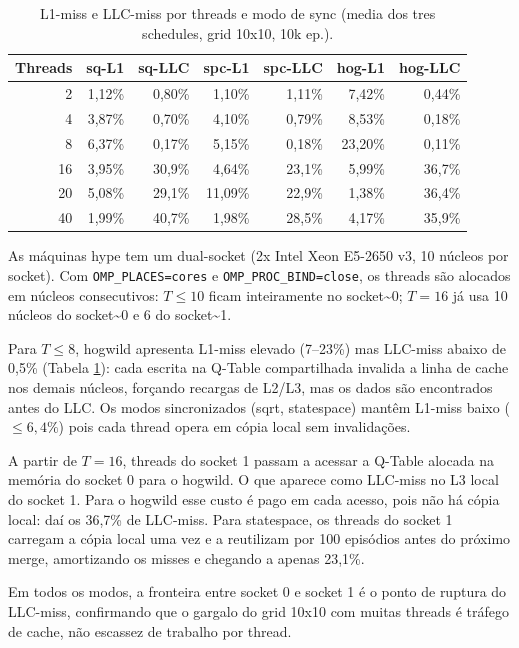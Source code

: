 \documentclass[12pt]{article}
\begin{document}
\begin{table}[htbp]
\caption{\label{tab:org0317c3a}L1-miss e LLC-miss por threads e modo de sync (media dos tres schedules, grid 10x10, 10k ep.).}
\centering
\small
\begin{tabular}{rrrrrrr}
\toprule
Threads & sq-L1 & sq-LLC & spc-L1 & spc-LLC & hog-L1 & hog-LLC\\
\midrule
2 & 1,12\% & 0,80\% & 1,10\% & 1,11\% & 7,42\% & 0,44\%\\
4 & 3,87\% & 0,70\% & 4,10\% & 0,79\% & 8,53\% & 0,18\%\\
8 & 6,37\% & 0,17\% & 5,15\% & 0,18\% & 23,20\% & 0,11\%\\
\midrule
16 & 3,95\% & 30,9\% & 4,64\% & 23,1\% & 5,99\% & 36,7\%\\
20 & 5,08\% & 29,1\% & 11,09\% & 22,9\% & 1,38\% & 36,4\%\\
40 & 1,99\% & 40,7\% & 1,98\% & 28,5\% & 4,17\% & 35,9\%\\
\bottomrule
\end{tabular}
\end{table}

As máquinas hype tem um dual-socket (2x Intel Xeon E5-2650 v3, 10
núcleos por socket). Com \texttt{OMP\_PLACES=cores} e \texttt{OMP\_PROC\_BIND=close}, os
threads são alocados em núcleos consecutivos: \(T \leq 10\) ficam
inteiramente no socket\textasciitilde{}0; \(T = 16\) já usa 10 núcleos do socket\textasciitilde{}0 e 6
do socket\textasciitilde{}1.

Para \(T \leq 8\), hogwild apresenta L1-miss elevado (7--23\%) mas LLC-miss
abaixo de 0,5\% (Tabela \ref{tab:org0317c3a}): cada escrita na Q-Table compartilhada
invalida a linha de cache nos demais núcleos, forçando recargas de
L2/L3, mas os dados são encontrados antes do LLC. Os modos
sincronizados (sqrt, statespace) mantêm L1-miss baixo (\(\leq 6,4\%\)) pois
cada thread opera em cópia local sem invalidações.

A partir de \(T = 16\), threads do socket 1 passam a acessar a Q-Table
alocada na memória do socket 0 para o hogwild. O que aparece como
LLC-miss no L3 local do socket 1. Para o hogwild esse custo é pago em
cada acesso, pois não há cópia local: daí os 36,7\% de LLC-miss.  Para
statespace, os threads do socket 1 carregam a cópia local uma vez e a
reutilizam por 100 episódios antes do próximo merge, amortizando os
misses e chegando a apenas 23,1\%.

Em todos os modos, a fronteira entre socket 0 e socket 1 é o ponto de
ruptura do LLC-miss, confirmando que o gargalo do grid 10x10 com
muitas threads é tráfego de cache, não escassez de
trabalho por thread.
\end{document}
